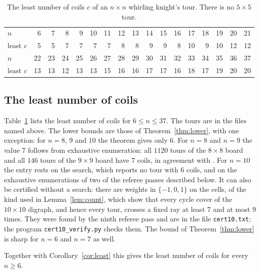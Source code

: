 \documentclass[11pt]{amsart}
\theoremstyle{remark}
\begin{document}
\begin{table}[h]
\centering\small
\begin{tabular}{lrrrrrrrrrrrrrrrr}
\toprule
$n$ & 6 & 7 & 8 & 9 & 10 & 11 & 12 & 13 & 14 & 15 & 16 & 17 & 18 & 19 & 20 & 21\\
least $c$ & 5 & 5 & 7 & 7 & 7 & 7 & 8 & 8 & 9 & 9 & 8 & 10 & 9 & 10 & 12 & 12\\
\midrule
$n$ & 22 & 23 & 24 & 25 & 26 & 27 & 28 & 29 & 30 & 31 & 32 & 33 & 34 & 35 & 36 & 37\\
least $c$ & 13 & 13 & 12 & 13 & 13 & 15 & 16 & 16 & 17 & 17 & 16 & 18 & 17 & 19 & 20 & 20\\
\bottomrule
\end{tabular}
\caption{The least number of coils $c$ of an $n\times n$ whirling knight's tour. There is no $5\times5$ tour.}
\label{tab:least}
\end{table}

\subsection*{The least number of coils}
Table~\ref{tab:least} lists the least number of coils for $6\le n\le37$. The tours are in the files named above.
The lower bounds are those of Theorem~\ref{thm:lower}, with one exception: for $n=8$, $9$ and $10$ the theorem gives
only $6$. For $n=8$ and $n=9$ the value $7$ follows from exhaustive enumeration: all $1120$ tours of the $8\times8$
board and all $146$ tours of the $9\times9$ board have $7$ coils, in agreement with \cite[answer 229]{knuth}. For
$n=10$ the entry rests on the search, which reports no tour with $6$ coils, and on the exhaustive enumerations
of two of the referee passes described below. It can also be certified without a search: there are weights in
$\{-1,0,1\}$ on the cells, of the kind used in Lemma~\ref{lem:count}, which show that every cycle cover of the
$10\times10$ digraph, and hence every tour, crosses a fixed ray at least $7$ and at most $9$ times. They were found
by the ninth referee pass and are in the file \texttt{cert10.txt}; the program \texttt{cert10\_verify.py} checks
them. The bound of Theorem~\ref{thm:lower} is
sharp for $n=6$ and $n=7$ as well.

Together with Corollary~\ref{cor:least} this gives the least number of coils for every $n\ge6$.
\end{document}
